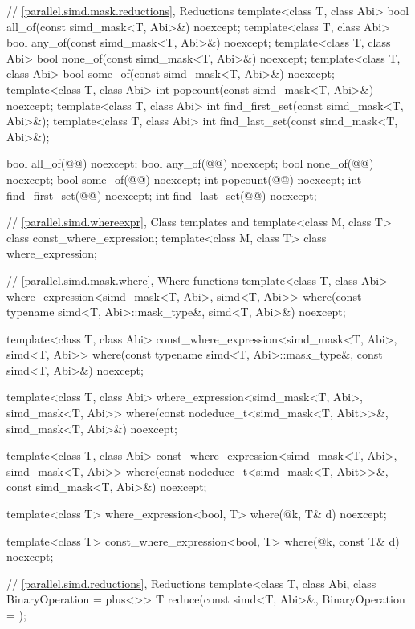 \begin{codeblock}
{{  // \ref{parallel.simd.mask.reductions}, Reductions
  template<class T, class Abi> bool all_of(const simd_mask<T, Abi>&) noexcept;
  template<class T, class Abi> bool any_of(const simd_mask<T, Abi>&) noexcept;
  template<class T, class Abi> bool none_of(const simd_mask<T, Abi>&) noexcept;
  template<class T, class Abi> bool some_of(const simd_mask<T, Abi>&) noexcept;
  template<class T, class Abi> int popcount(const simd_mask<T, Abi>&) noexcept;
  template<class T, class Abi> int find_first_set(const simd_mask<T, Abi>&);
  template<class T, class Abi> int find_last_set(const simd_mask<T, Abi>&);

  bool all_of(@@) noexcept;
  bool any_of(@@) noexcept;
  bool none_of(@@) noexcept;
  bool some_of(@@) noexcept;
  int popcount(@@) noexcept;
  int find_first_set(@@) noexcept;
  int find_last_set(@@) noexcept;

  // \ref{parallel.simd.whereexpr}, Class templates  and 
  template<class M, class T> class const_where_expression;
  template<class M, class T> class where_expression;

  // \ref{parallel.simd.mask.where}, Where functions
  template<class T, class Abi>
    where_expression<simd_mask<T, Abi>, simd<T, Abi>>
      where(const typename simd<T, Abi>::mask_type&, simd<T, Abi>&) noexcept;

  template<class T, class Abi>
    const_where_expression<simd_mask<T, Abi>, simd<T, Abi>>
      where(const typename simd<T, Abi>::mask_type&, const simd<T, Abi>&) noexcept;

  template<class T, class Abi>
    where_expression<simd_mask<T, Abi>, simd_mask<T, Abi>>
      where(const nodeduce_t<simd_mask<T, Abit>>&, simd_mask<T, Abi>&) noexcept;

  template<class T, class Abi>
    const_where_expression<simd_mask<T, Abi>, simd_mask<T, Abi>>
      where(const nodeduce_t<simd_mask<T, Abit>>&, const simd_mask<T, Abi>&) noexcept;

  template<class T>
    where_expression<bool, T>
      where(@\seebelow@ k, T& d) noexcept;

  template<class T>
    const_where_expression<bool, T>
      where(@\seebelow@ k, const T& d) noexcept;

  // \ref{parallel.simd.reductions}, Reductions
  template<class T, class Abi, class BinaryOperation = plus<>>
    T reduce(const simd<T, Abi>&,
             BinaryOperation = {});

}}
\end{codeblock}
